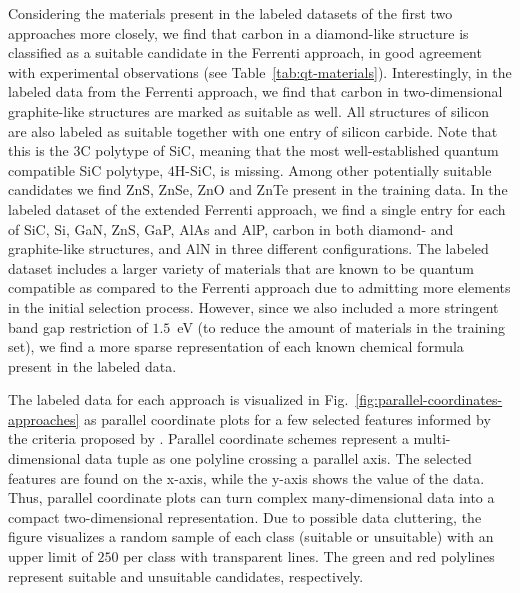 \documentclass[superscriptaddress,unsortedaddress,
 amsmath,amssymb,
 aps,
]{revtex4-2}
\begin{document}
Considering the materials present in the labeled datasets of the first two approaches more closely, we find that carbon in a diamond-like structure is classified as a suitable candidate in the Ferrenti approach, in good agreement with experimental observations (see Table~\ref{tab:qt-materials}). Interestingly, in the labeled data from the Ferrenti approach, we find that carbon in two-dimensional graphite-like structures are marked as suitable as well. All structures of silicon are also labeled as suitable together with one entry of silicon carbide. Note that this is the $3$C polytype of SiC, meaning that the most well-established quantum compatible SiC polytype, $4$H-SiC, is missing. 
Among other potentially suitable candidates we find ZnS, ZnSe, ZnO and ZnTe present in the training data.  
In the labeled dataset of the extended Ferrenti approach, we find a single entry for each of SiC, Si, GaN, ZnS, GaP, AlAs and AlP, carbon in both diamond- and graphite-like structures, and AlN in three different configurations. The labeled dataset includes a larger variety of materials that are known to be quantum compatible as compared to the Ferrenti approach due to admitting more elements in the initial selection process. However, since we also included a more stringent band gap restriction of $1.5$~eV (to reduce the amount of materials in the training set), we find a more sparse representation of each known chemical formula present in the labeled data. 

The labeled data for each approach is visualized in Fig.~\ref{fig:parallel-coordinates-approaches} as parallel coordinate plots for a few selected features informed by the criteria proposed by \citeauthor{Weber2010} \cite{Weber2010}. Parallel coordinate schemes  \cite{Inselberga1990, Inselberg1985} represent a multi-dimensional data tuple as one polyline crossing a parallel axis. The selected features are found on the x-axis, while the y-axis shows the value of the data. Thus, parallel coordinate plots can turn complex many-dimensional data into a compact  two-dimensional representation. Due to possible data cluttering, the figure visualizes a random sample of each class (suitable or unsuitable) with an upper limit of $250$ per class with transparent lines. The green and red polylines represent suitable and unsuitable candidates, respectively. 
\end{document}
